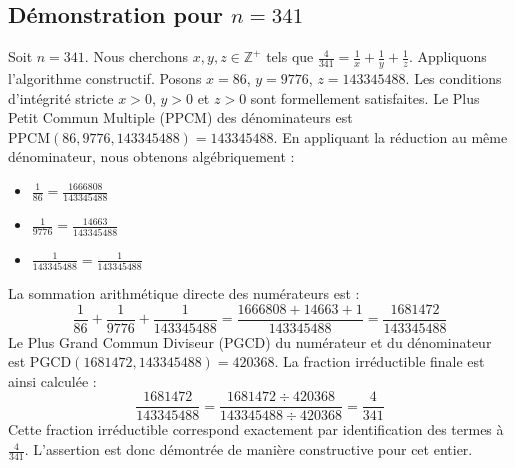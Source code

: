 \documentclass[11pt,a4paper]{article}
\begin{document}
\subsection{Démonstration pour $n = 341$}
Soit $n = 341$. Nous cherchons $x, y, z \in \mathbb{Z}^{+}$ tels que $\frac{4}{341} = \frac{1}{x} + \frac{1}{y} + \frac{1}{z}$.
Appliquons l'algorithme constructif. Posons $x = 86$, $y = 9776$, $z = 143345488$.
Les conditions d'intégrité stricte $x > 0$, $y > 0$ et $z > 0$ sont formellement satisfaites.
Le Plus Petit Commun Multiple (PPCM) des dénominateurs est $\text{PPCM}(86, 9776, 143345488) = 143345488$.
En appliquant la réduction au même dénominateur, nous obtenons algébriquement :
\begin{itemize}
    \item $\frac{1}{86} = \frac{1666808}{143345488}$
    \item $\frac{1}{9776} = \frac{14663}{143345488}$
    \item $\frac{1}{143345488} = \frac{1}{143345488}$
\end{itemize}
La sommation arithmétique directe des numérateurs est :
$$ \frac{1}{86} + \frac{1}{9776} + \frac{1}{143345488} = \frac{1666808 + 14663 + 1}{143345488} = \frac{1681472}{143345488} $$
Le Plus Grand Commun Diviseur (PGCD) du numérateur et du dénominateur est $\text{PGCD}(1681472, 143345488) = 420368$.
La fraction irréductible finale est ainsi calculée :
$$ \frac{1681472}{143345488} = \frac{1681472 \div 420368}{143345488 \div 420368} = \frac{4}{341} $$
Cette fraction irréductible correspond exactement par identification des termes à $\frac{4}{341}$. L'assertion est donc démontrée de manière constructive pour cet entier.
\end{document}
